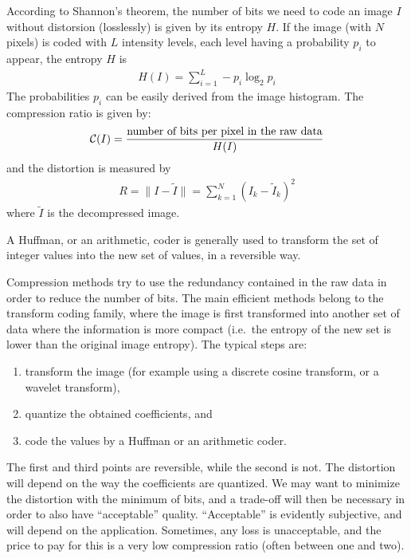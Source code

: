 According to Shannon's theorem, the number of bits we need to code 
an image $I$ without distorsion (losslessly) is given by its entropy $H$.
If the image (with $N$ pixels) is coded with $L$ intensity levels, each level having a 
probability $p_i$ to appear, the entropy $H$ is 
\begin{eqnarray}
H(I) = \sum_{i=1}^L - p_i \log_2 p_i
\end{eqnarray}
The probabilities $p_i$ can be easily derived from the image histogram.
The compression ratio is given by:
\begin{eqnarray}
{\cal{C}}(I) = \frac{\mbox{number of bits per pixel in the raw data}}{H(I)}
\end{eqnarray}
and the distortion is measured by
\begin{eqnarray}
R = \parallel I - \tilde I \parallel =  \sum_{k=1}^N (I_k - \tilde I_k)^2
\end{eqnarray}
where $\tilde I$ is the decompressed image.

A Huffman, or an arithmetic, coder is generally used to transform the set 
of integer values into the  new set of values, in a reversible way.

Compression methods try to use the redundancy contained in the raw data 
in order to reduce the number of bits. The main efficient methods belong to
 the transform
coding family, where the image is first transformed into another set of data
where the information is more compact (i.e.\ the entropy of the new set is 
lower than the original image entropy). The typical steps are:
\begin{enumerate}
\item transform the image (for example using a discrete cosine transform, or 
a wavelet transform),
\item quantize the obtained coefficients, and 
\item code the values by a Huffman or an arithmetic coder.
\end{enumerate}
The first and third points are reversible, while the second is not.
The distortion will depend on the way the coefficients are quantized. We
may want to minimize the distortion with the minimum of bits, and a 
trade-off will then be necessary in order to also have ``acceptable'' 
quality.  ``Acceptable'' is evidently subjective, and will depend
on the application. Sometimes, any loss is unacceptable, and the price 
to pay for this 
is a very low compression ratio (often between one and two). 

\newpage
